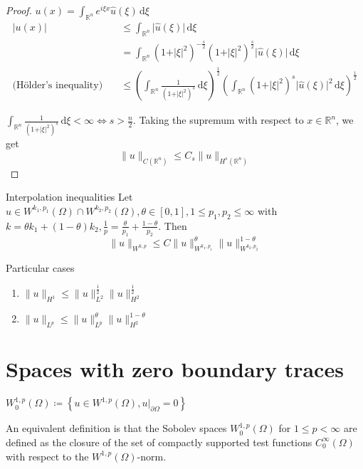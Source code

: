 \documentclass{report}
\begin{document}
\begin{proof}
    \(u(x) = \int_{\mathbb{R}^{n}} e^{i\xi x} \hat{u}(\xi) \,\mathrm{d}\xi \)
    \begin{align*}
        \vert u(x) \vert &\leq \int_{\mathbb{R}^{n}} \vert \hat{u}(\xi) \vert \,\mathrm{d}\xi \\
        &= \int_{\mathbb{R}^{n}} \left(1+\vert \xi \vert ^{2} \right)^{-\frac{s}{2}} \left(1+\vert \xi \vert ^{2} \right)^{\frac{s}{2}} \vert \hat{u}(\xi) \vert \,\mathrm{d}\xi \\
        \text{(Hölder's inequality)} \quad &\leq \left(\int_{\mathbb{R}^{n}} \frac{1}{\left(1+\vert \xi \vert ^{2}  \right)^{s}} \,\mathrm{d}\xi \right)^{\frac{1}{2}} \left(\int_{\mathbb{R}^{n}} \left(1+\vert \xi \vert ^{2} \right)^{s} \vert \hat{u}(\xi) \vert^{2} \,\mathrm{d}\xi \right)^{\frac{1}{2}}
    \end{align*} 

    \(\int_{\mathbb{R}^{n}} \frac{1}{\left(1+\vert \xi \vert ^{2} \right)^{s}} \,\mathrm{d}\xi < \infty \iff s>\frac{n}{2}\).
    Taking the supremum with respect to \(x \in \mathbb{R}^{n}\), we get
    \[\|u\|_{C(\mathbb{R}^{n})} \leq C_{s}\|u\|_{H^{s}(\mathbb{R}^{n})}\]
\end{proof}

\begin{theorem}{Interpolation inequalities}{}
    Let \(u \in W^{k_1, p_1}(\Omega) \cap W^{k_2, p_2}(\Omega), \theta \in [0,1], 1\leq p_1, p_2 \leq \infty\) with \(k = \theta k_1 + (1-\theta) k_2, \frac{1}{p} = \frac{\theta}{p_1} + \frac{1-\theta}{p_2} \). Then 
    \[
        \|u\|_{W^{k, p}} \leq C\|u\|_{W^{k_1, p_1}}^{\theta} \|u\|_{W^{k_2, p_2}}^{1-\theta}
    \]
\end{theorem}

\begin{corollary}{Particular cases}{}
    \begin{enumerate}
        \item \(\|u\|_{H^{1}} \leq \|u\|_{L^{2}}^{\frac{1}{2}} \|u\|_{H^{2}}^{\frac{1}{2}}\)
        \item \(\|u\|_{L^{p}} \leq \|u\|_{L^{p}}^{\theta} \|u\|_{H^{2}}^{1-\theta}\) 
    \end{enumerate}
\end{corollary}

\section{Spaces with zero boundary traces}
\begin{definition}{}{}
    \(W^{1, p}_{0}(\Omega) \coloneqq \left\{u \in W^{1, p}(\Omega), \left. u \right|_{\partial \Omega} = 0\right\} \)

    An equivalent definition is that the Sobolev spaces \(W^{1, p}_{0}(\Omega)\) for \(1 \leq p < \infty\) are defined as the closure of the set of compactly supported test functions \(C_{0}^{\infty}(\Omega)\) with respect to the \(W^{1, p}(\Omega)\)-norm.
\end{definition}
\end{document}

